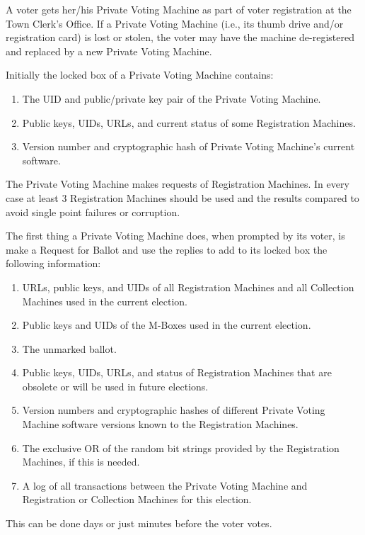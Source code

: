 \documentclass[12pt]{article}
\begin{document}
A voter gets her/his Private Voting Machine as part of voter
registration at the Town Clerk's Office.
If a Private Voting Machine (i.e., its thumb drive and/or registration
card) is lost or stolen, the voter may have the machine
de-registered and replaced by a new Private Voting Machine.

Initially the locked box of a Private Voting Machine contains:
\begin{enumerate}
\item The UID and public/private key pair of the Private Voting Machine.
\item Public keys, UIDs, URLs, and current status of some Registration Machines.
\item Version number and cryptographic hash of Private Voting Machine's current
      software.
\setcounter{PVM-COUNTER}{\value{enumi}}
\end{enumerate}

The Private Voting Machine
makes requests of Registration Machines.  In every case
at least 3 Registration Machines should be used and the
results compared to avoid single point failures or corruption.

The first thing a Private Voting Machine does, when prompted by
its voter, is make a Request for Ballot and use the replies to
add to its locked box the following information:
\begin{enumerate}
\setcounter{enumi}{\value{PVM-COUNTER}}
\item URLs, public keys, and UIDs
of all Registration Machines and all Collection
Machines used in the current election.
\item Public keys and UIDs of the M-Boxes used in the current election.
\item The unmarked ballot.
\item Public keys, UIDs, URLs, and status of Registration Machines that are
obsolete or will be used in future elections.
\item Version numbers and cryptographic hashes of different Private
Voting Machine software versions known to the Registration Machines.
\item The exclusive OR of the random bit strings provided by the
Registration Machines, if this is needed.
\item A log of all transactions between the Private Voting
Machine and Registration or Collection Machines for this election.
\setcounter{PVM-COUNTER}{\value{enumi}}
\end{enumerate}
This can be done days or just minutes before the voter votes.
\end{document}
